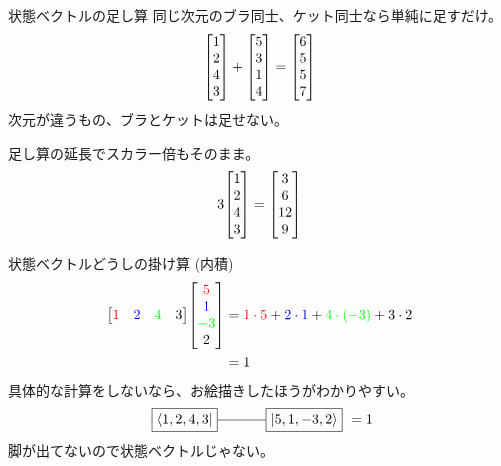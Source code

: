 \documentclass[dvipdfm]{beamer}
\begin{document}
\begin{frame}{状態ベクトルの足し算}
    同じ次元のブラ同士、ケット同士なら単純に足すだけ。
    \begin{equation*}
        \mqty[1\\2\\4\\3]
        +
        \mqty[5\\3\\1\\4]
        =
        \mqty[6\\5\\5\\7]
    \end{equation*}
    次元が違うもの、ブラとケットは足せない。

    足し算の延長でスカラー倍もそのまま。
    \begin{equation*}
        3\mqty[1\\2\\4\\3]
        =
        \mqty[3\\6\\12\\9]
    \end{equation*}
\end{frame}

\begin{frame}{状態ベクトルどうしの掛け算 (内積)}
    \begin{equation*}
        \begin{split}
            \mqty[\red{1} & \blue{2} & \green{4} & 3]
            \mqty[\red{5} \\ \blue{1} \\ \green{-3}\\ 2]
            &=
            \red{1\cdot5}
            +
            \blue{2\cdot1}
            +
            \green{4\cdot(-3)}
            +
            3\cdot2
            \\
            &=
            1
        \end{split}
    \end{equation*}
    具体的な計算をしないなら、お絵描きしたほうがわかりやすい。
    \begin{equation*}
        \vcenter{\hbox{
            \begin{tikzpicture}
                \node at(0,0)[draw,rectangle](ket){$\ket{5,1,-3,2}$};
                \node at(-3,0)[draw,rectangle](bra){$\bra{1,2,4,3}$};
                \draw(bra.east)--(ket.west);
            \end{tikzpicture}
        }}
        =
        1
    \end{equation*}
    脚が出てないので状態ベクトルじゃない。
\end{frame}
\end{document}
